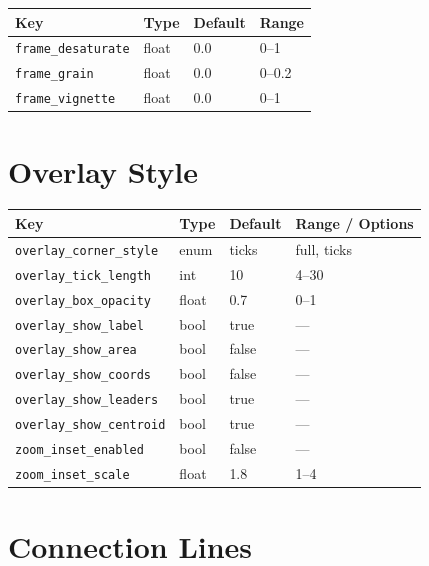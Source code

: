 \documentclass[11pt,a4paper,openany]{report}
\begin{document}
\begin{tabularx}{\linewidth}{@{}lllX@{}}
    \toprule
    \textbf{Key} & \textbf{Type} & \textbf{Default} & \textbf{Range} \\
    \midrule
    \texttt{frame\_desaturate} & float & 0.0 & 0--1 \\
    \texttt{frame\_grain}      & float & 0.0 & 0--0.2 \\
    \texttt{frame\_vignette}   & float & 0.0 & 0--1 \\
    \bottomrule
\end{tabularx}

\section{Overlay Style}

\begin{longtable}{@{}llll@{}}
    \toprule
    \textbf{Key} & \textbf{Type} & \textbf{Default} & \textbf{Range / Options} \\
    \midrule
    \endhead
    \texttt{overlay\_corner\_style}  & enum & ticks & full, ticks \\
    \texttt{overlay\_tick\_length}   & int  & 10    & 4--30 \\
    \texttt{overlay\_box\_opacity}   & float & 0.7  & 0--1 \\
    \texttt{overlay\_show\_label}    & bool & true  & --- \\
    \texttt{overlay\_show\_area}     & bool & false & --- \\
    \texttt{overlay\_show\_coords}   & bool & false & --- \\
    \texttt{overlay\_show\_leaders}  & bool & true  & --- \\
    \texttt{overlay\_show\_centroid} & bool & true  & --- \\
    \texttt{zoom\_inset\_enabled}    & bool & false & --- \\
    \texttt{zoom\_inset\_scale}      & float & 1.8  & 1--4 \\
    \bottomrule
\end{longtable}

\section{Connection Lines}
\end{document}
